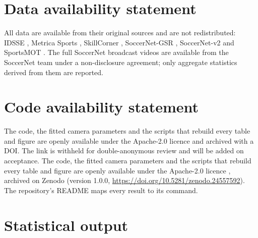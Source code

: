 \documentclass[]{interact}
\begin{document}
\section*{Data availability statement}
All data are available from their original sources and are not redistributed: IDSSE \citep{bassek2025idsse}, Metrica
Sports \citep{metrica_sample}, SkillCorner \citep{skillcorner_opendata}, SoccerNet-GSR \citep{somers2024gsr},
SoccerNet-v2 \citep{deliege2021soccernetv2} and SportsMOT \citep{cui2023sportsmot}. The full SoccerNet broadcast
videos are available from the SoccerNet team under a non-disclosure agreement; only aggregate statistics derived from
them are reported.

\section*{Code availability statement}
\ifanonymous
The code, the fitted camera parameters and the scripts that rebuild every table and figure are openly available under
the Apache-2.0 licence and archived with a DOI. The link is withheld for double-anonymous review and will be added on
acceptance.
\else
The code, the fitted camera parameters and the scripts that rebuild every table and figure are openly available under
the Apache-2.0 licence \citep{pitchlens}, archived on Zenodo (version 1.0.0,
\url{https://doi.org/10.5281/zenodo.24557592}). The repository's README maps every result to its command.
\fi




\appendix
\section{Statistical output}
\label{app:stats}
\end{document}
